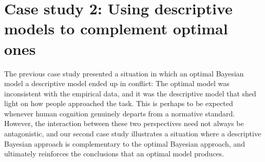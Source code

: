 

\section*{Case study 2: Using descriptive models to complement optimal ones} 

The previous case study presented a situation in which an optimal Bayesian model a descriptive model ended up in conflict: The optimal model was inconsistent with the empirical data, and it was the descriptive model that shed light on how people approached the task. This is perhaps to be expected whenever human cognition genuinely departs from a normative standard. However, the interaction between these two perspectives need not always be antagonistic, and our second case study illustrates a situation where a descriptive Bayesian approach is complementary to the optimal Bayesian approach, and ultimately reinforces the conclusions that an optimal model produces.




%

